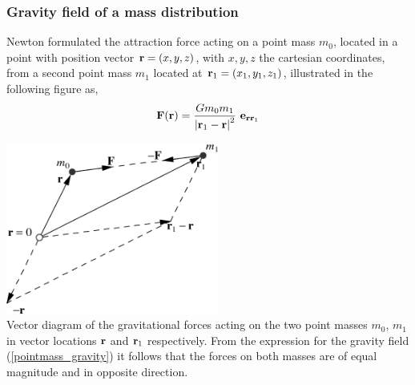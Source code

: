 \vspace{0.5cm}

\vspace{0.5cm}

\subsubsection{Gravity field of a mass distribution}
Newton formulated the attraction force acting on a point 
mass $m_0$, 
located in a point with position vector ${\bf r}=(x,y,z)$,
with $x,y,z$ the cartesian coordinates,
from a second point mass $m_1$ located at
${\bf r}_1=(x_1,y_1,z_1)$, illustrated in the following figure as,
\begin{equation}
{\bf F} ({\bf r}) 
        =\frac{G m_0 m_1}{\left | {\bf r}_1 - {\bf r} \right | ^2} ~ 
          {\bf e}_{{\bf r r}_1}
\label{pointmass_gravity}
\end{equation}

\begin{center}
\includegraphics[width=7cm]{images/gravity/gravity_diagram}\\
{\captionfont Vector diagram of the gravitational forces acting on the two 
point masses $m_0$, $m_1$ in vector locations ${\bf r}$ and
${\bf r}_1$ respectively.
From the expression for the gravity field (\ref{pointmass_gravity}) 
it follows that the forces on both masses
are of equal magnitude and in opposite direction. }
\end{center}

